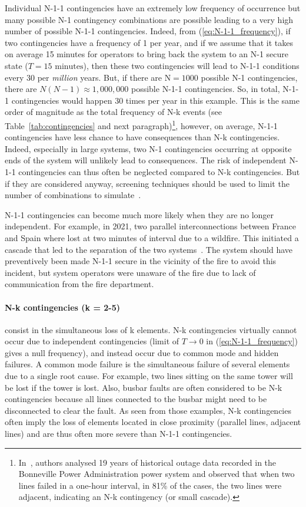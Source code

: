 Individual N-1-1 contingencies have an extremely low frequency of occurrence but many possible N-1 contingency combinations are possible leading to a very high number of possible N-1-1 contingencies. Indeed, from (\ref{eq:N-1-1_frequency}), if two contingencies have a frequency of 1 per year, and if we assume that it takes on average 15 minutes for operators to bring back the system to an N-1 secure state (\(T = 15 \text{ minutes}\)), then these two contingencies will lead to N-1-1 conditions every 30 per \emph{million} years. But, if there are \(\text{N} = 1000\) possible N-1 contingencies, there are \(N(N-1) \approx 1,000,000\) possible N-1-1 contingencies. So, in total, N-1-1 contingencies would happen 30 times per year in this example. This is the same order of magnitude as the total frequency of N-k events (see Table~\ref{tab:contingencies} and next paragraph)\footnote{In~\cite{ContingencyMotifs}, authors analysed 19 years of historical outage data recorded in the Bonneville Power Administration power system and observed that when two lines failed in a one-hour interval, in 81\% of the cases, the two lines were adjacent, indicating an N-k contingency (or small cascade).}, however, on average, N-1-1 contingencies have less chance to have consequences than N-k contingencies. Indeed, especially in large systems, two N-1 contingencies occurring at opposite ends of the system will unlikely lead to consequences. The risk of independent N-1-1 contingencies can thus often be neglected compared to N-k contingencies. But if they are considered anyway, screening techniques should be used to limit the number of combinations to simulate~\cite{VittalN-1-1}.

N-1-1 contingencies can become much more likely when they are no longer independent. For example, in 2021, two parallel interconnections between France and Spain where lost at two minutes of interval due to a wildfire. This initiated a cascade that led to the separation of the two systems~\cite{ENTSOEIbericSplit2021}. The system should have preventively been made N-1-1 secure in the vicinity of the fire to avoid this incident, but system operators were unaware of the fire due to lack of communication from the fire department.


\paragraph*{N-k contingencies (k = 2-5)} consist in the simultaneous loss of k elements. N-k contingencies virtually cannot occur due to independent contingencies (limit of \(T \to 0\) in (\ref{eq:N-1-1_frequency}) gives a null frequency), and instead occur due to common mode and hidden failures. A common mode failure is the simultaneous failure of several elements due to a single root cause. For example, two lines sitting on the same tower will be lost if the tower is lost. Also, busbar faults are often considered to be N-k contingencies because all lines connected to the busbar might need to be disconnected to clear the fault. As seen from those examples, N-k contingencies often imply the loss of elements located in close proximity (parallel lines, adjacent lines) and are thus often more severe than N-1-1 contingencies.

